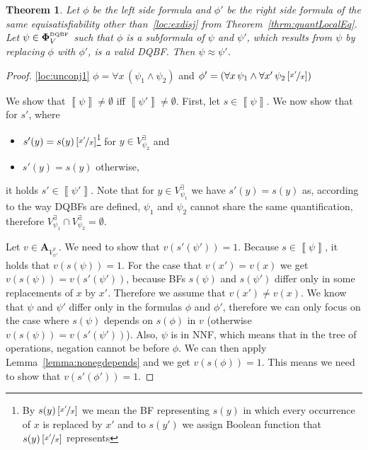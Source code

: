 \documentclass[
  digital, %
  color,
  twoside, %
  table,   %
  nolof,     %
  nolot,     %
]{fithesis3}
\newtheorem{theorem}{Theorem}[chapter] %
\theoremstyle{definition}
\theoremstyle{remark}
\newcommand{\seman}[1]{\left\llbracket {#1} \right\rrbracket}
\newcommand{\substitute}[2]{\left[ \nicefrac{#2}{#1} \right]}
\newcommand{\DQBF}[1]{\mathbf{\Phi}_{#1}^{\normalfont{\text{\tiny DQBF}}}}
\newcommand{\valtns}[1]{\mathbf{A}_{#1}}
\newcommand{\evars}[1]{V_{#1}^{\exists}}
\newcommand{\uvars}[1]{V_{#1}^{\forall}}
\newcommand{\itholds}{\,}
\begin{document}
\begin{theorem}
  \label{thrm:quantLocalSubformulas}
  Let $\phi$ be the left side formula and $\phi'$ be the right side formula of the same equisatisfiability other than~\eqref{loc:exdisj} from Theorem~\ref{thrm:quantLocalEq}. Let $\psi \in \DQBF{V}$ such that $\phi$ is a subformula of $\psi$ and $\psi'$, which results from $\psi$ by replacing $\phi$ with $\phi'$, is a valid DQBF. Then $\psi \approx \psi'$.
\end{theorem}
\begin{proof}
  \eqref{loc:unconj1} $\phi = \forall x \itholds (\psi_1 \land \psi_2)$ and $\phi' = \left(\forall x \itholds \psi_1 \land \forall x' \itholds \psi_2\substitute{x}{x'}\right)$
  
  We show that $\seman{\psi} \not= \emptyset$ iff $\seman{\psi'} \not= \emptyset$. First, let $s \in \seman{\psi}$. We now show that for $s'$, where 
  \begin{itemize}
      \item $s'(y) = s(y)\substitute{x}{x'}$\footnote{By $s(y)\substitute{x}{x'}$ we mean the BF representing $s(y)$ in which every occurrence of $x$ is replaced by $x'$ and to $s(y')$ we assign Boolean function that $s(y)\substitute{x}{x'}$ represents} for $y \in \evars{\psi_2}$ and
      \item $s'(y) = s(y)$ otherwise,
  \end{itemize}
  it holds $s' \in \seman{\psi'}$. Note that for $y \in \evars{\psi_1}$ we have $s'(y) = s(y)$ as, according to the way DQBFs are defined, $\psi_1$ and $\psi_2$ cannot share the same quantification, therefore $\evars{\psi_1} \cap \evars{\psi_2} = \emptyset$.
  
  Let $v \in \valtns{\uvars{\psi'}}$. We need to show that $v(s'(\psi')) = 1$. Because $s \in \seman{\psi}$, it holds that $v(s(\psi)) = 1$. For the case that $v(x') = v(x)$ we get $v(s(\psi)) = v(s'(\psi'))$, because BFs $s(\psi)$ and $s(\psi')$ differ only in some replacements of $x$ by $x'$. Therefore we assume that $v(x') \not= v(x)$. We know that $\psi$ and $\psi'$ differ only in the formulas $\phi$ and $\phi'$, therefore we can only focus on the case where $s(\psi)$ depends on $s(\phi)$ in $v$ (otherwise $v(s(\psi)) = v(s'(\psi'))$). %
  Also, $\psi$ is in NNF, which means that in the tree of operations, negation cannot be before $\phi$. We can then apply Lemma~\ref{lemma:nonegdepends} and we get $v(s(\phi)) = 1$.
  This means we need to show that $v(s'(\phi')) = 1$.
  

\end{proof}
\end{document}
